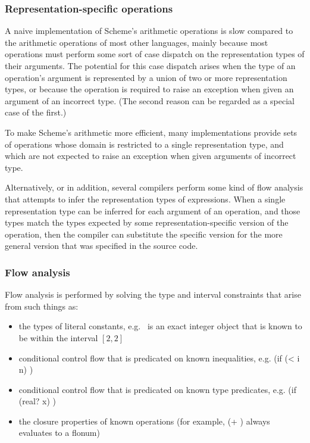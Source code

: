 \documentclass[twoside,twocolumn]{algol60}
\begin{document}
\subsubsection{Representation-specific operations}

A naive implementation of Scheme's arithmetic operations is slow
compared to the arithmetic operations of most other languages, mainly
because most operations must perform some sort of case dispatch on the
representation types of their arguments.  The potential for this case
dispatch arises when the type of an operation's argument is
represented by a union of two or more representation types, or because
the operation is required to raise an exception when given an argument of
an incorrect type.  (The second reason can be regarded as a special
case of the first.)

To make Scheme's arithmetic more efficient, many implementations
provide sets of operations whose domain is restricted to a single
representation type, and which are not expected to raise an exception
when given arguments of incorrect type.

Alternatively, or in addition, several compilers perform some kind of
flow analysis that attempts to infer the representation types of
expressions.  When a single representation type can be inferred for
each argument of an operation, and those types match the types
expected by some representation-specific version of the operation,
then the compiler can substitute the specific version for the more
general version that was specified in the source code.

\subsubsection{Flow analysis}

Flow analysis is performed by solving the type and interval
constraints that arise from such things as:

\begin{itemize}
\item the types of literal constants, e.g.\ {} is an exact
  integer object
  that is known to be within the interval $[2,2]$
  
\item conditional control flow that is predicated on known
  inequalities, e.g. {\cf (if (< i n)  )}
  
\item conditional control flow that is predicated on known type
  predicates, e.g. {\cf (if (real? x)  )}
  
\item the closure properties of known operations (for example, {\cf (+
     )} always evaluates to a flonum)
\end{itemize}
  
\end{document}
